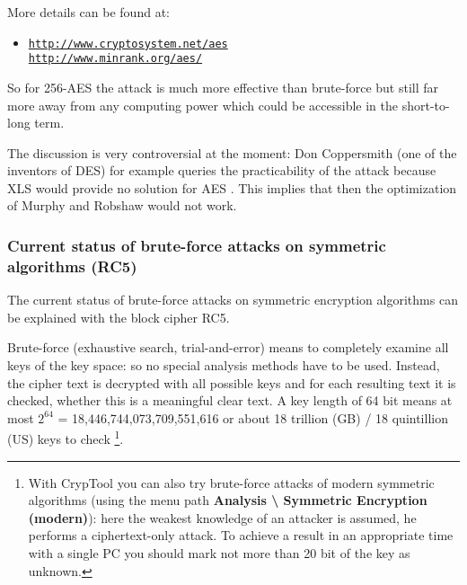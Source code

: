 More details can be found at:
\vspace{-10pt}
\begin{itemize}
  \item[] \href{http://www.cryptosystem.net/aes}
               {\texttt{http://www.cryptosystem.net/aes}}\\
          \href{http://www.minrank.org/aes/}
               {\texttt{http://www.minrank.org/aes/}}
\end{itemize}

So for 256-AES the attack is much more effective than brute-force but still far more away from any computing power which could be accessible in the short-to-long term. 

The discussion is very controversial at the moment: Don Coppersmith (one of the
inventors of DES) for example queries the practicability of the attack because
XLS would provide no solution for AES \cite{Coppersmith2002}. This implies that
then the optimization of Murphy and Robshaw \cite{Robshaw2002b} would not work.


\subsubsection{Current status of brute-force attacks on 
symmetric algorithms (RC5)}
\label{Brute-force-gegen-Symmetr}

The current status of brute-force attacks on symmetric encryption algorithms can be explained with the block cipher RC5.

Brute-force (exhaustive search, trial-and-error) means to completely examine all keys of the key space: so no special analysis methods have to be used. Instead, the cipher text is decrypted with all possible keys and for each resulting text it is checked, whether this is a meaningful clear text. A key length of 64 bit means at most $2^{64}$ = 18,446,744,073,709,551,616 or about 18 trillion (GB) / 18 quintillion (US)  keys to check%
\footnote{%
    With CrypTool you can also try brute-force attacks
    of modern symmetric algorithms (using the menu path
    {\bf Analysis \textbackslash{} Symmetric Encryption (modern)}): here
    the weakest knowledge of an attacker is assumed, he performs a 
    ciphertext-only attack.
    To achieve a result in an appropriate time with a single PC you should 
    mark not more than 20 bit of the key as unknown.
}.

